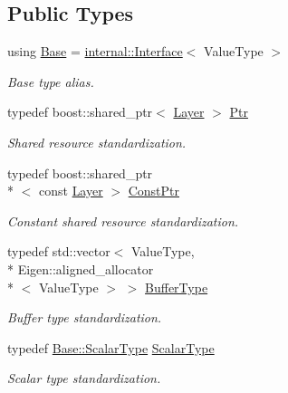 \subsection*{Public Types}
\begin{DoxyCompactItemize}
\item 
using \hyperlink{classffnn_1_1layer_1_1_layer_a54b8c1b013fe141fbfc7f4dc63ab6882}{Base} = \hyperlink{classffnn_1_1layer_1_1internal_1_1_interface}{internal\-::\-Interface}$<$ Value\-Type $>$
\begin{DoxyCompactList}\small\item\em Base type alias. \end{DoxyCompactList}\item 
typedef boost\-::shared\-\_\-ptr$<$ \hyperlink{classffnn_1_1layer_1_1_layer}{Layer} $>$ \hyperlink{classffnn_1_1layer_1_1_layer_ab909b3fbacb9688059f9f22302f266f4}{Ptr}
\begin{DoxyCompactList}\small\item\em Shared resource standardization. \end{DoxyCompactList}\item 
typedef boost\-::shared\-\_\-ptr\\*
$<$ const \hyperlink{classffnn_1_1layer_1_1_layer}{Layer} $>$ \hyperlink{classffnn_1_1layer_1_1_layer_aa1b22cc70a5ae0101cae5a9825043fbc}{Const\-Ptr}
\begin{DoxyCompactList}\small\item\em Constant shared resource standardization. \end{DoxyCompactList}\item 
typedef std\-::vector$<$ Value\-Type, \\*
Eigen\-::aligned\-\_\-allocator\\*
$<$ Value\-Type $>$ $>$ \hyperlink{classffnn_1_1layer_1_1_layer_a3f2e9c375d9bcf80e6000e9e53ba212d}{Buffer\-Type}
\begin{DoxyCompactList}\small\item\em Buffer type standardization. \end{DoxyCompactList}\item 
typedef \hyperlink{classffnn_1_1layer_1_1internal_1_1_interface_a7f834e3365e5199bcbcd16d9abd63941}{Base\-::\-Scalar\-Type} \hyperlink{classffnn_1_1layer_1_1_layer_ab63020e6e3d9270a748cb22c2432c93a}{Scalar\-Type}
\begin{DoxyCompactList}\small\item\em Scalar type standardization. \end{DoxyCompactList}\item 

\end{DoxyCompactItemize}
